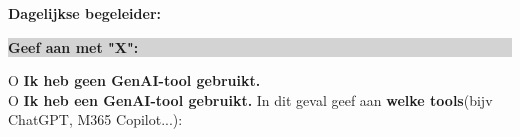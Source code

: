 \textbf{Dagelijkse begeleider:} \dotfill

\vspace{2em}

\noindent
\colorbox{lightgray}{\parbox{\dimexpr\linewidth-2\fboxsep\relax}{\textbf{Geef aan met "X":}}}

\vspace{1em}

O \textbf{Ik heb geen GenAI-tool gebruikt.} \\[1em]

O \textbf{Ik heb een GenAI-tool gebruikt.} In dit geval geef aan \textbf{welke tools}(bijv ChatGPT, M365 Copilot...): \dotfill

\newpage



\newcommand{\Cell}[1]{\begin{minipage}[t]{\linewidth}\raggedright\small #1\end{minipage}}

\setlength{\tabcolsep}{6pt}
\renewcommand{\arraystretch}{1.2}

